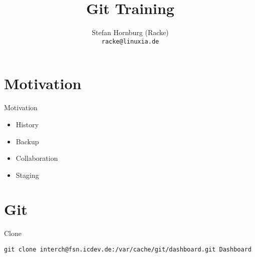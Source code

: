 \usepackage[T1]{fontenc}
\usepackage{mathptmx}
\usepackage[scaled=.90]{helvet}
\usepackage{courier}

\usepackage{beamerthemesplit}
\usepackage{verbatim}
\usepackage{hyperref}
\usepackage{listings}
\lstset{language=Perl,basicstyle=\footnotesize,tabsize=3,showstringspaces=false}

\title{Git Training}
\author[racke]{Stefan Hornburg (Racke)\\ \texttt{racke@linuxia.de}}


\maketitle{}

\begin{frame}
  \titlepage
\end{frame}

\tableofcontents

\section{Motivation}

\begin{frame}{Motivation}
  \begin{itemize}
    \item History
    \item Backup
    \item Collaboration
    \item Staging
  \end{itemize}
\end{frame}

\section{Git}
\begin{frame}{Clone}
\begin{lstlisting}
git clone interch@fsn.icdev.de:/var/cache/git/dashboard.git Dashboard
\end{lstlisting}
\end{frame}



